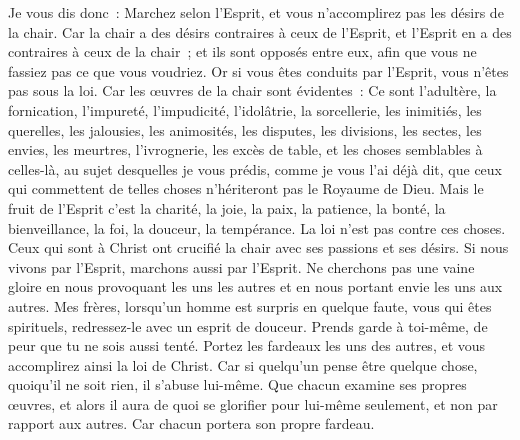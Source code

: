 \begin{multicols}{2}
Je vous dis donc~: Marchez selon l'Esprit, et vous n'accomplirez pas les désirs de la chair.
Car la chair a des désirs contraires à ceux de l'Esprit, et l'Esprit en a des contraires à ceux de la chair~; et ils sont opposés entre eux, afin que vous ne fassiez pas ce que vous voudriez.
Or si vous êtes conduits par l'Esprit, vous n'êtes pas sous la loi.
Car les œuvres de la chair sont évidentes~: Ce sont l'adultère, la fornication, l'impureté, l'impudicité,
l'idolâtrie, la sorcellerie, les inimitiés, les querelles, les jalousies, les animosités, les disputes, les divisions, les sectes,
les envies, les meurtres, l'ivrognerie, les excès de table, et les choses semblables à celles-là, au sujet desquelles je vous prédis, comme je vous l'ai déjà dit, que ceux qui commettent de telles choses n'hériteront pas le Royaume de Dieu.
Mais le fruit de l'Esprit c'est la charité, la joie, la paix, la patience, la bonté, la bienveillance, la foi, la douceur, la tempérance.
La loi n'est pas contre ces choses.
Ceux qui sont à Christ ont crucifié la chair avec ses passions et ses désirs.
Si nous vivons par l'Esprit, marchons aussi par l'Esprit.
Ne cherchons pas une vaine gloire en nous provoquant les uns les autres et en nous portant envie les uns aux autres.
\VerseOne{}Mes frères, lorsqu'un homme est surpris en quelque faute, vous qui êtes spirituels, redressez-le avec un esprit de douceur. Prends garde à toi-même, de peur que tu ne sois aussi tenté.
Portez les fardeaux les uns des autres, et vous accomplirez ainsi la loi de Christ.
Car si quelqu'un pense être quelque chose, quoiqu'il ne soit rien, il s'abuse lui-même.
Que chacun examine ses propres œuvres, et alors il aura de quoi se glorifier pour lui-même seulement, et non par rapport aux autres.
Car chacun portera son propre fardeau.

\end{multicols}
